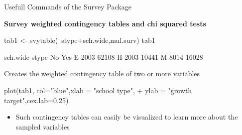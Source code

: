 \documentclass[11pt,german,hideothersubsections]{beamer}
\begin{document}
\begin{frame}[fragile]{Usefull Commands} {of the Survey Package}
\footnotesize{
\begin{center}
\textbf{Survey weighted contingency tables and chi squared tests}
\end{center}
\begin{Schunk}
\begin{Sinput}
 tab1 <- svytable(~stype+sch.wide,mul.surv)
 tab1
\end{Sinput}
\begin{Soutput}
     sch.wide
stype    No   Yes
    E  2003 62108
    H  2003 10441
    M  8014 16028
\end{Soutput}
\end{Schunk}
\begin{itemize}\footnotesize{
\item Creates the weighted contingency table of two or more variables}
\end{itemize}\footnotesize{

\begin{Schunk}
\begin{Sinput}
 plot(tab1, col="blue",xlab = "school type", 
+      ylab = "growth target",cex.lab=0.25)
\end{Sinput}
\end{Schunk}
}
\begin{itemize}
\item Such contingency tables can easily be visualized to learn more about the sampled variables
\end{itemize}

}
\end{frame}
\end{document}
